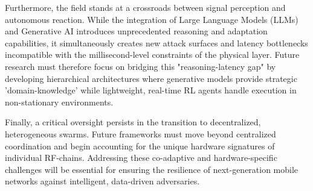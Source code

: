 \documentclass[journal]{IEEEtran}
\newcommand{\adm}[1]{{\color{orange}{[#1]}}}
\newcommand{\rar}[1]{{\color{blue}{[#1]}}}
\begin{document}
Furthermore, the field stands at a crossroads between signal perception and autonomous reaction. While the integration of Large Language Models (LLMs) and Generative AI introduces unprecedented reasoning and adaptation capabilities, it simultaneously creates new attack surfaces and latency bottlenecks incompatible with the millisecond-level constraints of the physical layer. 
Future research must therefore focus on bridging this "reasoning-latency gap" by developing hierarchical architectures where generative models provide strategic 'domain-knowledge' while lightweight, real-time RL agents handle execution in non-stationary environments.

Finally, a critical oversight persists in the transition to decentralized, heterogeneous swarms.
Future frameworks must move beyond centralized coordination and begin accounting for the unique hardware signatures of individual RF-chains. \adm{yes, but not only}
Addressing these co-adaptive and hardware-specific challenges will be essential for ensuring the resilience of next-generation mobile networks against intelligent, data-driven adversaries.

\ifCLASSOPTIONcaptionsoff
  \newpage
\fi

\nocite{*}


\end{document}
